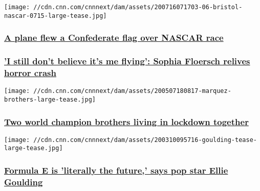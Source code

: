 \href{/2020/07/16/motorsport/nascar-confederate-flag-bristol-speedway-trnd-spt-intl/index.html}{}

\texttt{[image: //cdn.cnn.com/cnnnext/dam/assets/200716071703-06-bristol-nascar-0715-large-tease.jpg]}

\hypertarget{a-plane-flew-a-confederate-flag-over-nascar-race}{%
\subsubsection{\texorpdfstring{\href{/2020/07/16/motorsport/nascar-confederate-flag-bristol-speedway-trnd-spt-intl/index.html}{A
plane flew a Confederate flag over NASCAR
race}}{A plane flew a Confederate flag over NASCAR race}}\label{a-plane-flew-a-confederate-flag-over-nascar-race}}

\hypertarget{i-still-dont-believe-its-me-flying-sophia-floersch-relives-horror-crash}{%
\subsubsection{\texorpdfstring{\href{/2020/05/31/motorsport/sophia-floersch-crash-le-mans-formula-3-laureus-cmd-spt-intl/index.html}{'I
still don't believe it's me flying': Sophia Floersch relives horror
crash}}{'I still don't believe it's me flying': Sophia Floersch relives horror crash}}\label{i-still-dont-believe-its-me-flying-sophia-floersch-relives-horror-crash}}

\href{/2020/05/08/motorsport/marc-marquez-moto-gp-spt-intl-cmd/index.html}{}

\texttt{[image: //cdn.cnn.com/cnnnext/dam/assets/200507180817-marquez-brothers-large-tease.jpg]}

\hypertarget{two-world-champion-brothers-living-in-lockdown-together}{%
\subsubsection{\texorpdfstring{\href{/2020/05/08/motorsport/marc-marquez-moto-gp-spt-intl-cmd/index.html}{Two
world champion brothers living in lockdown
together}}{Two world champion brothers living in lockdown together}}\label{two-world-champion-brothers-living-in-lockdown-together}}

\href{/2020/03/10/motorsport/ellie-goulding-formula-e-supercharged-spt-intl/index.html}{}

\texttt{[image: //cdn.cnn.com/cnnnext/dam/assets/200310095716-goulding-tease-large-tease.jpg]}

\hypertarget{formula-e-is-literally-the-future-says-pop-star-ellie-goulding}{%
\subsubsection{\texorpdfstring{\href{/2020/03/10/motorsport/ellie-goulding-formula-e-supercharged-spt-intl/index.html}{Formula
E is 'literally the future,' says pop star Ellie
Goulding}}{Formula E is 'literally the future,' says pop star Ellie Goulding}}\label{formula-e-is-literally-the-future-says-pop-star-ellie-goulding}}

